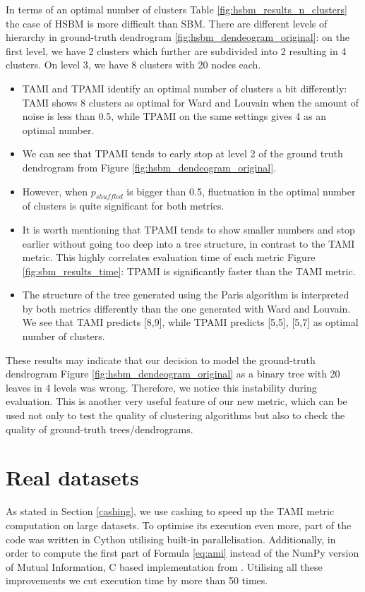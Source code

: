 In terms of an optimal number of clusters Table \ref{fig:hsbm_results_n_clusters} the case of HSBM is more difficult than SBM. There are different levels of hierarchy in ground-truth dendrogram \ref{fig:hsbm_dendeogram_original}: on the first level, we have 2 clusters which further are subdivided into 2 resulting in 4 clusters. On level 3, we have 8 clusters with 20 nodes each. 

\begin{itemize}
	\item TAMI and TPAMI identify an optimal number of clusters a bit differently: TAMI shows 8 clusters as optimal for Ward and Louvain when the amount of noise is less than 0.5, while TPAMI on the same settings gives 4 as an optimal number.
	\item We can see that TPAMI tends to early stop at level 2 of the ground truth dendrogram from Figure \ref{fig:hsbm_dendeogram_original}. 
	\item However, when $p_{shuffled}$ is bigger than 0.5, fluctuation in the optimal number of clusters is quite significant for both metrics.
	\item It is worth mentioning that TPAMI tends to show smaller numbers and stop earlier without going too deep into a tree structure, in contrast to the TAMI metric. This highly correlates evaluation time of each metric Figure \ref{fig:sbm_results_time}: TPAMI is significantly faster than the TAMI metric. 
	\item The structure of the tree generated using the Paris algorithm is interpreted by both metrics differently than the one generated with Ward and Louvain. We see that TAMI predicts [8,9], while TPAMI predicts [5,5], [5,7] as optimal number of clusters.
\end{itemize} 

These results may indicate that our decision to model the ground-truth dendrogram Figure \ref{fig:hsbm_dendeogram_original} as a binary tree with 20 leaves in 4 levels was wrong. Therefore, we notice this instability during evaluation. This is another very useful feature of our new metric, which can be used not only to test the quality of clustering algorithms but also to check the quality of ground-truth trees/dendrograms.

\section{Real datasets}
As stated in Section \ref{cashing}, we use cashing to speed up the TAMI metric computation on large datasets. To optimise its execution even more, part of the code was written in Cython \cite{behnel2011cython} utilising built-in parallelisation. Additionally, in order to compute the first part of Formula \ref{eq:ami} instead of the NumPy \cite{harris2020array} version of Mutual Information, C based implementation from \cite{feast}. Utilising all these improvements we cut execution time by more than 50 times. 

